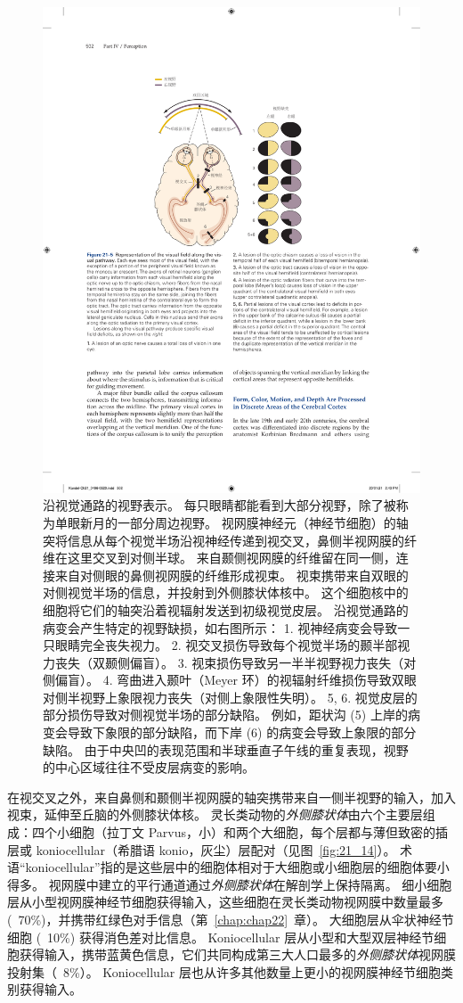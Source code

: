 \begin{figure}[htbp]
	\centering
	\includegraphics[width=0.6\linewidth]{chap21/fig_21_5}
	\caption{沿视觉通路的视野表示。
		每只眼睛都能看到大部分视野，除了被称为单眼新月的一部分周边视野。
		视网膜神经元（神经节细胞）的轴突将信息从每个视觉半场沿视神经传递到视交叉，鼻侧半视网膜的纤维在这里交叉到对侧半球。
		来自颞侧视网膜的纤维留在同一侧，连接来自对侧眼的鼻侧视网膜的纤维形成视束。
		视束携带来自双眼的对侧视觉半场的信息，并投射到外侧膝状体核中。
		这个细胞核中的细胞将它们的轴突沿着视辐射发送到初级视觉皮层。
		沿视觉通路的病变会产生特定的视野缺损，如右图所示：
		1. 视神经病变会导致一只眼睛完全丧失视力。
		2. 视交叉损伤导致每个视觉半场的颞半部视力丧失（双颞侧偏盲）。
		3. 视束损伤导致另一半半视野视力丧失（对侧偏盲）。
		4. 弯曲进入颞叶（Meyer 环）的视辐射纤维损伤导致双眼对侧半视野上象限视力丧失（对侧上象限性失明）。
		5, 6. 视觉皮层的部分损伤导致对侧视觉半场的部分缺陷。
		例如，距状沟 (5) 上岸的病变会导致下象限的部分缺陷，而下岸 (6) 的病变会导致上象限的部分缺陷。 由于中央凹的表现范围和半球垂直子午线的重复表现，视野的中心区域往往不受皮层病变的影响。}
	\label{fig:21_5}
\end{figure}


在视交叉之外，来自鼻侧和颞侧半视网膜的轴突携带来自一侧半视野的输入，加入视束，延伸至丘脑的外侧膝状体核。
灵长类动物的\textit{外侧膝状体}由六个主要层组成：四个小细胞（拉丁文 Parvus，小）和两个大细胞，每个层都与薄但致密的插层或 koniocellular（希腊语 konio，灰尘）层配对（见图~\ref{fig:21_14}）。
术语“koniocellular”指的是这些层中的细胞体相对于大细胞或小细胞层的细胞体要小得多。
视网膜中建立的平行通道通过\textit{外侧膝状体}在解剖学上保持隔离。
细小细胞层从小型视网膜神经节细胞获得输入，这些细胞在灵长类动物视网膜中数量最多 (~70\%)，并携带红绿色对手信息（第~\ref{chap:chap22}~章）。
大细胞层从伞状神经节细胞 (~10\%) 获得消色差对比信息。
Koniocellular 层从小型和大型双层神经节细胞获得输入，携带蓝黄色信息，它们共同构成第三大人口最多的\textit{外侧膝状体}视网膜投射集（~8\%）。
Koniocellular 层也从许多其他数量上更小的视网膜神经节细胞类别获得输入。


